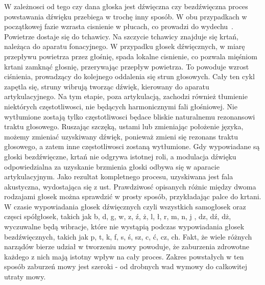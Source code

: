 \documentclass[a4paper,12 pt]{report}
\begin{document}
 W zależnosci od tego czy dana głoska jest dźwięczna czy bezdźwięczna proces powstawania dźwięku przebiega w trochę inny sposób. W obu przypadkach w początkowej fazie wzrasta cisnienie w płucach, co prowadzi do wydechu~\cite{produkcja_mowy}. Powietrze dostaje się do tchawicy. Na szczycie tchawicy znajduje się krtań, należąca do aparatu fonacyjnego. W przypadku głosek dźwięcznych, w miarę przepływu powietrza przez głośnię, spada lokalne cisnienie, co pozwala mięśniom krtani zamknąć głosnię, przerywając przepływ powietrza. To powoduje wzrost ciśnienia, prowadzący do kolejnego oddalenia się strun głosowych. Cały ten cykl zapętla się, struny wibrują tworząc dźwięk, kierowany do aparatu artykulacyjnego. Na tym etapie, poza artykulacją, zachodzi również tłumienie niektórych częstotliwosci, nie będących harmonicznymi fali głośniowej. Nie wytłumione zostają tylko częstotliwosci będace bliskie naturalnemu rezonansowi traktu głosowego. Ruszając szczęką, ustami lub zmieniając położenie języka, możemy zmieniać uzyskiwany dźwięk, ponieważ zmieni się rezonans traktu głosowego, a zatem inne częstotliwosci zostaną wytłumione. Gdy wypowiadane są głoski bezdźwięczne, krtań nie odgrywa istotnej roli, a modulacja dźwięku odpowiedzialna za uzyskanie brzmienia głoski odbywa się w aparacie artykulacyjnym. Jako rezultat kompletnego procesu, uzyskiwana jest fala akustyczna, wydostająca się z ust. Prawdziwosć opisanych różnic między dwoma rodzajami głosek można sprawdzić w prosty sposób, przykładając palce do krtani. W czasie wypowiadania głosek dźwięcznych czyli wszystkich samogłosek oraz częsci spółgłosek, takich jak b, d, g, w, z, ź, ż, l, ł, r, m, n, j , dz, dź, dż, wyczuwalne będą wibracje, które nie wystąpią podczas wypowiadania głosek bezdźwięcznych, takich jak p, t, k, f, s, ś, sz, c, ć, cz, ch.
Fakt, że wiele różnych narządów bierze udział w tworzeniu mowy powoduje, że zaburzenia zdrowotne każdego z nich mają istotny wpływ na cały proces. Zakres powstałych w ten sposób zaburzeń mowy jest szeroki - od drobnych wad wymowy do całkowitej utraty mowy.
\end{document}
